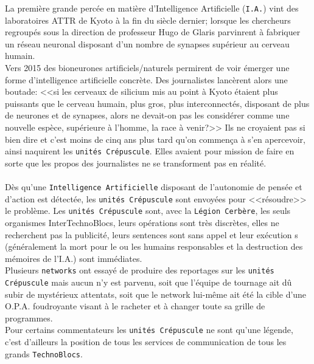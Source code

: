 \documentclass[11pt,twoside,a4paper]{article}
\begin{document}
\begin{multicols*}{2}
La premi{\`e}re grande perc{\'e}e en mati{\`e}re d'Intelligence Artificielle (\texttt{I.A.}) vint des laboratoires ATTR de Kyoto {\`a} la fin du si{\`e}cle dernier; lorsque les chercheurs regroup{\'e}s sous la direction de professeur Hugo de Glaris parvinrent {\`a} fabriquer un r{\'e}seau neuronal disposant d'un nombre de synapses sup{\'e}rieur au cerveau humain. ~\\

Vers 2015 des bioneurones artificiels/naturels permirent de voir {\'e}merger une forme d'intelligence artificielle concr{\`e}te. Des journalistes lanc{\`e}rent alors une boutade: <<si les cerveaux de silicium mis au point {\`a} Kyoto {\'e}taient plus puissants que le cerveau humain, plus gros, plus interconnect{\'e}s, disposant de plus de neurones et de synapses, alors ne devait-on pas les consid{\'e}rer comme une nouvelle esp{\`e}ce, sup{\'e}rieure {\`a} l'homme, la race {\`a} venir?>> Ils ne croyaient pas si bien dire et c'est moins de cinq ans plus tard qu'on commen\c{c}a {\`a} s'en apercevoir, ainsi naquirent les \texttt{unit{\'e}s Cr{\'e}puscule}. Elles avaient pour mission de faire en sorte que les propos des journalistes ne se transforment pas en r{\'e}alit{\'e}. ~\\

\vfill ~\\ %

D{\`e}s qu'une \texttt{Intelligence Artificielle} disposant de l'autonomie de pens{\'e}e et d'action est d{\'e}tect{\'e}e, les \texttt{unit{\'e}s Cr{\'e}puscule} sont envoy{\'e}es pour <<r{\'e}soudre>> le probl{\`e}me. Les \texttt{unit{\'e}s Cr{\'e}puscule} sont, avec la \texttt{L{\'e}gion Cerb{\`e}re}, les seuls organismes InterTechnoBlocs, leurs op{\'e}rations sont tr{\`e}s discr{\`e}tes, elles ne recherchent pas la publicit{\'e}, leurs sentences sont sans appel et leur ex{\'e}cution s (g{\'e}n{\'e}ralement la mort pour le ou les humains responsables et la destruction des m{\'e}moires de l'I.A.) sont imm{\'e}diates. ~\\

Plusieurs \texttt{networks} ont essay{\'e} de produire des reportages sur les \texttt{unit{\'e}s Cr{\'e}puscule} mais aucun n'y est parvenu, soit que l'{\'e}quipe de tournage ait d{\^u} subir de myst{\'e}rieux attentats, soit que le network lui-m{\^e}me ait {\'e}t{\'e} la cible d'une O.P.A. foudroyante visant {\`a} le racheter et {\`a} changer toute sa grille de programmes. ~\\

Pour certains commentateurs les \texttt{unit{\'e}s Cr{\'e}puscule} ne sont qu'une l{\'e}gende, c'est d'ailleurs la position de tous les services de communication de tous les grands \texttt{TechnoBlocs}. %


\end{multicols*}
\end{document}
